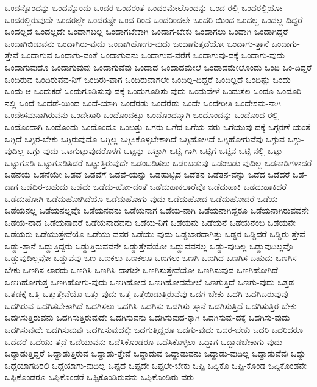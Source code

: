 {ಒಂದನ್ನೊಂದನ್ನು
ಒಂದನ್ನೊಂದು
ಒಂದರ
ಒಂದರಂತೆ
ಒಂದರಮೇಲೊಂದನ್ನು
ಒಂದ-ರಲ್ಲಿ
ಒಂದರಲ್ಲಿಯೋ
ಒಂದರಲ್ಲಿರುವುದೇ
ಒಂದರಲ್ಲೇ
ಒಂದರಷ್ಟೇ
ಒಂದ-ರಿಂದ
ಒಂದರಿಂದಲೇ
ಒಂದರಿ-ಯಿಂದ
ಒಂದಲ್ಲ
ಒಂದಲ್ಲ-ದಿದ್ದರೆ
ಒಂದಲ್ಲದೆ
ಒಂದಲ್ಲದೇ
ಒಂದಾಗಬಲ್ಲ
ಒಂದಾಗಬೇಕಾಗಿ
ಒಂದಾಗ-ಬೇಕು
ಒಂದಾಗಲು
ಒಂದಾಗಿ
ಒಂದಾಗಿದ್ದರೆ
ಒಂದಾಗಿಬಿಡುವನು
ಒಂದಾಗಿರು-ವುದು
ಒಂದಾಗಿಹೋಗು-ವುದು
ಒಂದಾಗುತ್ತದೆಯೋ
ಒಂದಾಗು-ತ್ತಾನೆ
ಒಂದಾಗು-ತ್ತೇವೆ
ಒಂದಾಗುವ
ಒಂದಾಗು-ವಂತೆ
ಒಂದಾಗುವನು
ಒಂದಾಗುವ-ವರೆಗೆ
ಒಂದಾಗುವು-ದಕ್ಕೆ
ಒಂದಾಗು-ವುದು
ಒಂದಾಗುವುದೊ
ಒಂದಾಗುವುವು
ಒಂದಾಗುವೆವು
ಒಂದಾದ
ಒಂದಾದಮೇಲೆ
ಒಂದಾದಮೇಲೊಂದು
ಒಂದಿ
ಒಂ-ದಿದ್ದರೆ
ಒಂದಿರುವ
ಒಂದಿರುವವ-ನಿಗೆ
ಒಂದಿರು-ವಾಗ
ಒಂದಿರುವಾಗಲೇ
ಒಂದಿಲ್ಲ-ದಿದ್ದರೆ
ಒಂದಿಲ್ಲದೆ
ಒಂದಿಷ್ಟು
ಒಂದು
ಒಂದು-ಆ
ಒಂದುಕಡೆ
ಒಂದುಗೂಡಿಸುವು-ದಕ್ಕೆ
ಒಂದುಗೂಡಿಸು-ವುದು
ಒಂದುವೇಳೆ
ಒಂದುಸಲ
ಒಂದೂ
ಒಂದೂರಿ-ನಲ್ಲಿ
ಒಂದೆ
ಒಂದೆಡೆ-ಯಿಂದ
ಒಂದೆ-ಯಾಗಿ
ಒಂದೆರಡು
ಒಂದೆರೆಡು
ಒಂದೇ
ಒಂದೇರೀತಿ
ಒಂದೇಸಮ-ನಾಗಿ
ಒಂದೇಸಮನಾಗಿರುವನು
ಒಂದೇಸಾರಿ
ಒಂದೊಂದಕ್ಕೂ
ಒಂದೊಂದನ್ನಾಗಿ
ಒಂದೊಂದನ್ನು
ಒಂದೊಂದ-ರಲ್ಲಿ
ಒಂದೊಂದಾಗಿ
ಒಂದೊಂದು
ಒಂದೊಂದೂ
ಒಂಬತ್ತು
ಒಗರು
ಒಗೆದ
ಒಗೆಯ-ವರು
ಒಗೆಯುವು-ದಕ್ಕೆ
ಒಗ್ಗರಣೆ-ಯಂತೆ
ಒಗ್ಗಿದೆ
ಒಗ್ಗಿರ-ಬೇಕು
ಒಗ್ಗಿರುವುದೊ
ಒಗ್ಗಿಲ್ಲ
ಒಗ್ಗಿಸಿಕೊಳ್ಳಬೇಕಾಗಿದೆ
ಒಗ್ಗಿಹೋಗಿದೆ
ಒಗ್ಗಿಹೋಗುವೆವು
ಒಗ್ಗುವ
ಒಗ್ಗು-ವುದಿಲ್ಲ
ಒಗ್ಗು-ವುದು
ಒಟಗುಟ್ಟುವುದರೊಳಗೆ
ಒಟ್ಟನ್ನು
ಒಟ್ಟಾಗಿ
ಒಟ್ಟಿ-ಗಾಗಿ
ಒಟ್ಟಿಗೆ
ಒಟ್ಟಿನ
ಒಟ್ಟಿ-ನಲ್ಲಿ
ಒಟ್ಟು
ಒಟ್ಟುಗೂಡಿ
ಒಟ್ಟುಗೂಡಿಸಿದರೆ
ಒಟ್ಟುತ್ತಿರುವುದೇ
ಒಡಂಬಡಿಸಲು
ಒಡಂಬಡುವು
ಒಡಂಬಡು-ವುದಿಲ್ಲ
ಒಡನಾಡಿಗಳಾದರೆ
ಒಡನೆಯೆ
ಒಡನೆಯೇ
ಒಡವೆ
ಒಡವೆಗೆ
ಒಡವೆ-ಯನ್ನು
ಒಡಹುಟ್ಟಿದ
ಒಡೆತನ
ಒಡೆತನ-ವನ್ನು
ಒಡೆದ
ಒಡೆದರೆ
ಒಡೆ-ದಾಗ
ಒಡೆದಿರ-ಬಹುದು
ಒಡೆದು
ಒಡೆದು-ಹೋ-ದಂತೆ
ಒಡೆದುಹಾಕಲಾರೆವೊ
ಒಡೆದುಹಾಕಿ
ಒಡೆದುಹಾಕಿದರೆ
ಒಡೆದುಹೋಗಿ
ಒಡೆದುಹೋಗಿದೆಯೊ
ಒಡೆದುಹೋಗು-ವುದು
ಒಡೆದುಹೋದ
ಒಡೆದುಹೋದರೆ
ಒಡೆಯ
ಒಡೆಯನಲ್ಲ
ಒಡೆಯನಲ್ಲವೊ
ಒಡೆಯನವನು
ಒಡೆಯನಾಗ
ಒಡೆಯ-ನಾಗಿ
ಒಡೆಯನಾಗಿದ್ದರೂ
ಒಡೆಯನಾಗಿರುವವನೇ
ಒಡೆಯ-ನಾದ
ಒಡೆಯನಾದರೆ
ಒಡೆಯನಾದವನು
ಒಡೆಯ-ನಿಗೆ
ಒಡೆಯನು
ಒಡೆಯನೆ
ಒಡೆಯನೆಂಬ
ಒಡೆಯನೇ
ಒಡೆಯರು
ಒಡೆಯುತ್ತೇವೆಯೊ
ಒಡೆಯು-ವವರ
ಒಡೆಯು-ವುದು
ಒಡ್ಡಬಾರದಾಗಿತ್ತು
ಒಡ್ಡರ
ಒಡ್ಡಿದರೆ
ಒಡ್ಡಿರು-ತ್ತೇವೆ
ಒಡ್ಡು-ತ್ತಾನೆ
ಒಡ್ಡುತ್ತಿದ್ದರು
ಒಡ್ಡುತ್ತಿರುವವನೇ
ಒಡ್ಡುತ್ತೇವೆಯೋ
ಒಡ್ಡುವವನಲ್ಲ
ಒಡ್ಡು-ವುದಿಲ್ಲ
ಒಡ್ಡುವುದಿಲ್ಲವೊ
ಒಡ್ಡುವುದಿಲ್ಲವೋ
ಒಡ್ಡುವೆವು
ಒಣ
ಒಣಕಲು
ಒಣಕಲೂ
ಒಣಗಲು
ಒಣಗಿ
ಒಣಗಿದ
ಒಣಗಿಸ-ಬಹುದು
ಒಣಗಿಸ-ಬೇಕು
ಒಣಗಿಸ-ಲಾರದು
ಒಣಗಿಸಿ
ಒಣಗಿಸಿ-ದಾಗಲೇ
ಒಣಗಿಸುತ್ತೇವೆಯೋ
ಒಣಗಿಸುವುದ
ಒಣಗಿಹೋಗಿದೆ
ಒಣಗಿಹೋಗುತ್ತ
ಒಣಗಿಹೋಗು-ವುದು
ಒಣಗಿಹೋದ
ಒಣಗಿಹೋದಮೇಲೆ
ಒಣಗುತ್ತಿದೆ
ಒಣಗು-ವುದು
ಒತ್ತಡ
ಒತ್ತಡಕ್ಕೆ
ಒತ್ತಿ
ಒತ್ತುತ್ತೇವೆಯೊ
ಒತ್ತು-ವುದು
ಒತ್ತೆ
ಒತ್ತೆಯಿಡುತ್ತಿರುವೆವು
ಒದಗ-ಬೇಕು
ಒದಗಿ
ಒದಗಿಬರುವುವು
ಒದಗಿರುವ
ಒದಗಿಸಬೇಕಾಗಿದೆ
ಒದಗಿಸಲು
ಒದಗಿಸಿ
ಒದಗಿಸು
ಒದಗಿಸು-ತ್ತಾನೆ
ಒದಗಿಸುತ್ತಿದೆ
ಒದಗಿಸುತ್ತಿರ-ಬೇಕು
ಒದಗಿಸುತ್ತಿರುವನು
ಒದಗಿಸುತ್ತಿರುವುದೇ
ಒದಗಿಸುವನು
ಒದಗಿಸುವುದ-ಕ್ಕಾಗಿ
ಒದಗಿಸುವು-ದಕ್ಕೆ
ಒದಗಿಸು-ವುದು
ಒದಗಿಸುವುದೇ
ಒದಗಿಸುವುವು
ಒದಗೀಸುವುದಕ್ಕೇ
ಒದಗುತ್ತಿದ್ದರೂ
ಒದಗು-ವುದು
ಒದರ-ಬೇಕು
ಒದರಿ
ಒದರಿದರೂ
ಒದೆದರೆ
ಒದೆಯು-ತ್ತದೆ
ಒದೆಯುವನು
ಒದೆಸಿಕೊಂಡರೂ
ಒದೆಸಿಕೊಳ್ಳಲು
ಒದ್ದಾಗ
ಒದ್ದಾಡಬೇಕಾಗು-ವುದು
ಒದ್ದಾಡುತ್ತಿದ್ದರೆ
ಒದ್ದಾಡುತ್ತಿರುವ
ಒದ್ದಾಡು-ತ್ತೇವೆ
ಒದ್ದಾಡುವ
ಒದ್ದಾಡುವನು
ಒದ್ದಾಡು-ವುದಿಲ್ಲ
ಒದ್ದಾಡುವೆವು
ಒದ್ದು
ಒದ್ದೆಯಾಗದಿರಲಿ
ಒದ್ದೆಯಾಗು-ವುದಿಲ್ಲ
ಒಪ್ಪದೆ
ಒಪ್ಪದೇ
ಒಪ್ಪಲೇ-ಬೇಕು
ಒಪ್ಪಿ
ಒಪ್ಪಿಕೊ
ಒಪ್ಪಿ-ಕೊಂಡ
ಒಪ್ಪಿಕೊಂಡನೇ
ಒಪ್ಪಿಕೊಂಡರೂ
ಒಪ್ಪಿಕೊಂಡರೆ
ಒಪ್ಪಿಕೊಂಡಿರುವನು
ಒಪ್ಪಿಕೊಂಡಿರು-ವರು
}
